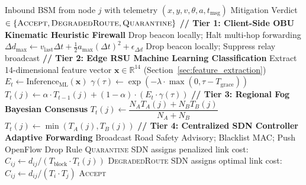 \documentclass[conference]{IEEEtran}
\begin{document}
\begin{algorithm}[t]
\caption{EdgeTrust-VANET Multi-Tier Decision Workflow}
\label{alg:edgetrust}
\footnotesize
\begin{algorithmic}[1]
\REQUIRE Inbound BSM from node $j$ with telemetry $(x,y,v,\theta,a,t_{\text{msg}})$
\ENSURE Mitigation Verdict $\in \{\textsc{Accept}, \textsc{DegradedRoute}, \textsc{Quarantine}\}$
\STATE \textbf{// Tier 1: Client-Side OBU Kinematic Heuristic Firewall}
    \STATE Drop beacon locally; Halt multi-hop forwarding 
\ENDIF
\STATE $\Delta d_{\text{max}} \leftarrow v_{\text{last}}\Delta t + \frac{1}{2}a_{\text{max}}(\Delta t)^2 + \epsilon_{\Delta d}$
    \STATE Drop beacon locally; Suppress relay broadcast
\ENDIF
\STATE \textbf{// Tier 2: Edge RSU Machine Learning Classification}
    \STATE Extract 14-dimensional feature vector $\mathbf{x} \in \mathbb{R}^{14}$ (Section~\ref{sec:feature_extraction})
    \STATE $E_t \leftarrow \text{Inference}_{\text{ML}}(\mathbf{x})$ 
\ENDIF
\STATE $\gamma(\tau) \leftarrow \exp\left(-\lambda \cdot \max(0, \tau - T_{\text{grace}})\right)$ 
\STATE $T_t(j) \leftarrow \alpha \cdot T_{t-1}(j) + (1-\alpha) \cdot (E_t \cdot \gamma(\tau))$
\STATE \textbf{// Tier 3: Regional Fog Bayesian Consensus}
    \STATE $T_t(j) \leftarrow \dfrac{N_A T_A(j) + N_B T_B(j)}{N_A + N_B}$
        \STATE $T_t(j) \leftarrow \min(T_A(j), T_B(j))$ 
    \ENDIF
\ENDIF
\STATE \textbf{// Tier 4: Centralized SDN Controller Adaptive Forwarding}
    \STATE Broadcast Road Safety Advisory; Blacklist MAC; Push OpenFlow Drop Rule
    \RETURN \textsc{Quarantine}
    \STATE SDN assigns penalized link cost: $C_{ij} \leftarrow d_{ij} / (T_{\text{block}} \cdot T_t(j))$
    \RETURN \textsc{DegradedRoute}
\ELSE
    \STATE SDN assigns optimal link cost: $C_{ij} \leftarrow d_{ij} / (T_i \cdot T_j)$
    \RETURN \textsc{Accept}
\ENDIF
\end{algorithmic}
\end{algorithm}

\end{document}
